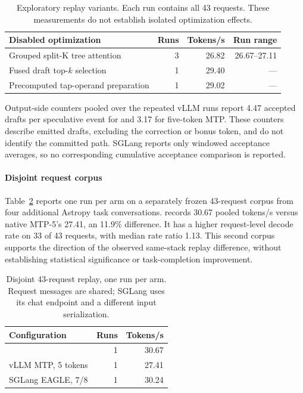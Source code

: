 \begin{table}[t]
\caption{Exploratory replay variants. Each run contains all 43 requests. These measurements do not establish isolated optimization effects.}
\label{tab:replay-variants}
\centering\small
\setlength{\tabcolsep}{3pt}
\begin{tabular}{@{}lrrr@{}}
\toprule
Disabled optimization & Runs & Tokens/s & Run range \\
\midrule
Grouped split-K tree attention & 3 & 26.82 & 26.67--27.11 \\
Fused draft top-$k$ selection & 1 & 29.40 & --- \\
Precomputed tap-operand preparation & 1 & 29.02 & --- \\
\bottomrule
\end{tabular}
\end{table}

Output-side counters pooled over the repeated vLLM runs report 4.47 accepted drafts per speculative event for \sys{} and 3.17 for five-token MTP. These counters describe emitted drafts, excluding the correction or bonus token, and do not identify the committed path. SGLang reports only windowed acceptance averages, so no corresponding cumulative acceptance comparison is reported.

\paragraph{Disjoint request corpus}
Table~\ref{tab:disjoint-replay} reports one run per arm on a separately frozen 43-request corpus from four additional Astropy task conversations. \sys{} records 30.67 pooled tokens/s versus native MTP-5's 27.41, an 11.9\% difference. It has a higher request-level decode rate on 33 of 43 requests, with median rate ratio 1.13. This second corpus supports the direction of the observed same-stack replay difference, without establishing statistical significance or task-completion improvement.

\begin{table}[t]
\caption{Disjoint 43-request replay, one run per arm. Request messages are shared; SGLang uses its chat endpoint and a different input serialization.}
\label{tab:disjoint-replay}
\centering\small
\begin{tabular}{@{}lrr@{}}
\toprule
Configuration & Runs & Tokens/s \\
\midrule
\sys{} & 1 & 30.67 \\
vLLM MTP, 5 tokens & 1 & 27.41 \\
SGLang EAGLE, 7/8 & 1 & 30.24 \\
\bottomrule
\end{tabular}
\end{table}

